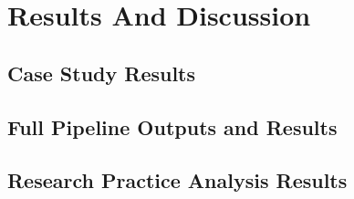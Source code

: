\chapter{Results And Discussion}
\label{Chapter4}

\section{Case Study Results}
\section{Full Pipeline Outputs and Results}
\section{Research Practice Analysis Results}



